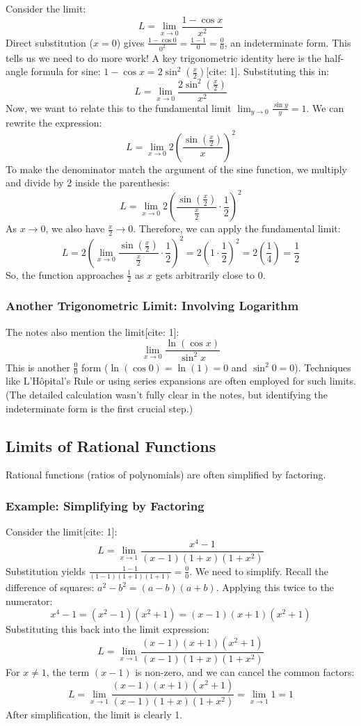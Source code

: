 \documentclass[12pt]{article}
\begin{document}
Consider the limit:
\[ L = \lim_{x \to 0} \frac{1 - \cos x}{x^2} \]
Direct substitution ($x=0$) gives $\frac{1-\cos 0}{0^2} = \frac{1-1}{0} = \frac{0}{0}$, an indeterminate form. This tells us we need to do more work! A key trigonometric identity here is the half-angle formula for sine: $1 - \cos x = 2 \sin^2\left(\frac{x}{2}\right)$[cite: 1]. Substituting this in:
\[ L = \lim_{x \to 0} \frac{2 \sin^2\left(\frac{x}{2}\right)}{x^2} \]
Now, we want to relate this to the fundamental limit $\lim_{y \to 0} \frac{\sin y}{y} = 1$. We can rewrite the expression:
\[ L = \lim_{x \to 0} 2 \left( \frac{\sin\left(\frac{x}{2}\right)}{x} \right)^2 \]
To make the denominator match the argument of the sine function, we multiply and divide by 2 inside the parenthesis:
\[ L = \lim_{x \to 0} 2 \left( \frac{\sin\left(\frac{x}{2}\right)}{\frac{x}{2}} \cdot \frac{1}{2} \right)^2 \]
As $x \to 0$, we also have $\frac{x}{2} \to 0$. Therefore, we can apply the fundamental limit:
\[ L = 2 \left( \lim_{x \to 0} \frac{\sin\left(\frac{x}{2}\right)}{\frac{x}{2}} \cdot \frac{1}{2} \right)^2 = 2 \left( 1 \cdot \frac{1}{2} \right)^2 = 2 \left(\frac{1}{4}\right) = \frac{1}{2} \]
So, the function approaches $\frac{1}{2}$ as $x$ gets arbitrarily close to 0.

\subsubsection{Another Trigonometric Limit: Involving Logarithm}
The notes also mention the limit[cite: 1]:
\[ \lim_{x \to 0} \frac{\ln(\cos x)}{\sin^2 x} \]
This is another $\frac{0}{0}$ form ($\ln(\cos 0) = \ln(1) = 0$ and $\sin^2 0 = 0$). Techniques like L'Hôpital's Rule or using series expansions are often employed for such limits. (The detailed calculation wasn't fully clear in the notes, but identifying the indeterminate form is the first crucial step.)

\subsection{Limits of Rational Functions}

Rational functions (ratios of polynomials) are often simplified by factoring.

\subsubsection{Example: Simplifying by Factoring}
Consider the limit[cite: 1]:
\[ L = \lim_{x \to 1} \frac{x^4 - 1}{(x-1)(1+x)(1+x^2)} \]
Substitution yields $\frac{1-1}{(1-1)(1+1)(1+1)} = \frac{0}{0}$. We need to simplify. Recall the difference of squares: $a^2 - b^2 = (a-b)(a+b)$. Applying this twice to the numerator:
\[ x^4 - 1 = (x^2 - 1)(x^2 + 1) = (x-1)(x+1)(x^2+1) \]
Substituting this back into the limit expression:
\[ L = \lim_{x \to 1} \frac{(x-1)(x+1)(x^2+1)}{(x-1)(1+x)(1+x^2)} \]
For $x \neq 1$, the term $(x-1)$ is non-zero, and we can cancel the common factors:
\[ L = \lim_{x \to 1} \frac{(x-1)(x+1)(x^2+1)}{(x-1)(1+x)(1+x^2)} = \lim_{x \to 1} 1 = 1 \]
After simplification, the limit is clearly 1.
\end{document}
